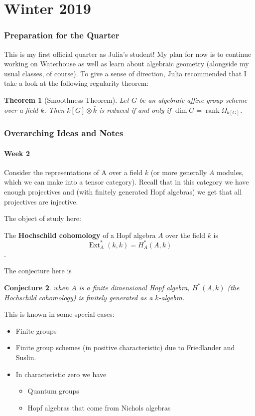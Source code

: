 \documentclass[12pt]{article}
\theoremstyle{nonumberbreak}
\theoremstyle{changebreak}
\newtheorem{thm}{Theorem}[subsection]
\newtheorem{conj}[thm]{Conjecture}
\theoremstyle{nonumberplain}
\theoremstyle{change}
\DeclareMathOperator{\Ext}{Ext}
\DeclareMathOperator{\rank}{rank}
\let\oldpart\part%
\renewcommand{\part}{\clearpage\oldpart}%
\begin{document}
\part{Winter 2019}
\section{Preparation for the Quarter}
This is my first official quarter as Julia's student! My plan for now is to continue working on Waterhouse as well
as learn about algebraic geometry (alongside my usual classes, of course).
To give a sense of direction, Julia recommended that I take a look at the following regularity theorem:
\begin{thm}[Smoothness Theorem]\label{smooth}
	Let $G$ be an algebraic affine group scheme over a field $k$. Then $k[G]\otimes \bar k$ is reduced if and
	only if $\dim G = \rank \Omega_{k[G]}$.
\end{thm}

\section{Overarching Ideas and Notes}
\subsection{Week 2}
Consider the representations of A over a field $k$ (or more generally $A$ modules, which we can make into a tensor category).
Recall that in this category we have enough projectives and (with finitely generated Hopf algebras) we get that all projectives are injective.

The object of study here:
\begin{defn}
	The \textbf{Hochschild cohomology} of a Hopf algebra $A$ over the field $k$ is 
	\[\Ext_A^*(k,k)=H^*_A(A,k)\].
\end{defn}

The conjecture here is
\begin{conj}
	when $A$ is a finite dimensional Hopf algebra, $H^*(A,k)$ (the Hochschild cohomology) 
	is finitely generated as a $k$-algebra.
\end{conj}
This is known in some special cases:
\begin{itemize}
	\item Finite groups
	\item Finite group schemes (in positive characteristic) due to Friedlander and Suslin.
	\item In characteristic zero we have
	\begin{itemize}
		\item Quantum groups
		\item Hopf algebras that come from Nichols algebras
	\end{itemize}
\end{itemize}
\end{document}
